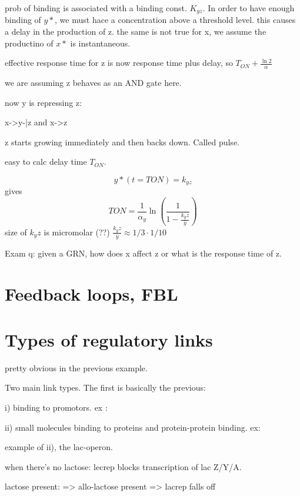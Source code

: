 \documentclass{article}
\begin{document}
prob of binding is associated with a binding const. $K_{yz}$. In order to have enough binding of $y*$, we must hace a concentration above a threshold level. this causes a delay in the production of z. the same is not true for x, we assume the productino of $x*$ is instantaneous. 

effective response time for z is now response time plus delay, so $T_{ON} + \frac{\ln2}{\alpha}$

we are assuming z behaves as an AND gate here. 


now y is repressing z: 

x->y-|z and x->z

z starts growing immediately and then backs down. Called pulse. 


easy to calc delay time $T_{ON}$. 

\begin{equation}
	y*(t = T{ON}) = k_{yz}
\end{equation}
gives 
\begin{equation}
	T{ON} = \frac{1}{\alpha _y}\ln\left(\frac{1}{1-\frac{k_yz}{\bar y}}\right)
\end{equation}
size of $k_yz$ is micromolar (??)
$\frac{k_yz}{\bar y}\approx 1/3 \cdot 1/10$

Exam q: given a GRN, how does x affect z or what is the response time of z.







\section{Feedback loops, FBL}
\section{Types of regulatory links}
pretty obvious in the previous example. 

Two main link types. The first is basically the previous: 

i) binding to promotors. ex :

ii) small molecules binding to proteins and protein-protein binding. ex:


example of ii), the lac-operon. 

when there's no lactose: lecrep blocks transcription of lac Z/Y/A. 

lactose present: => allo-lactose present => lacrep falls off 
\end{document}
